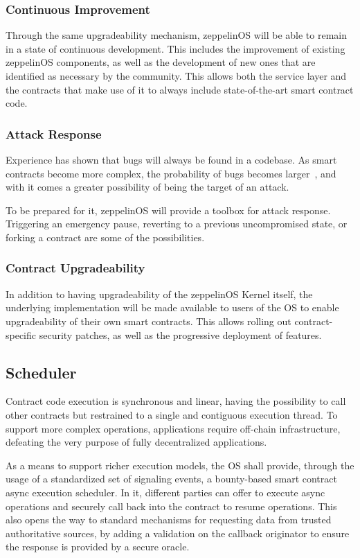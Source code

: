 \documentclass[]{article}
\makeatletter
\DeclareRobustCommand{\_}{%
  \leavevmode\vbox{%
    \hrule\@width.5em
          \@height-.26ex
          \@depth\dimexpr.26ex+.28pt\relax}}
\makeatother
\begin{document}
\subsubsection{Continuous Improvement}

Through the same upgradeability mechanism, zeppelinOS will be able
to remain in a state of continuous development. This includes the
improvement of existing zeppelinOS components, as well as the
development of new ones that are identified as necessary by the
community. This allows both the service layer and the contracts that
make use of it to always include state-of-the-art smart contract code.

\subsubsection{Attack Response}

Experience has shown that bugs will always be found in a codebase. As smart
contracts become more complex, the probability of bugs becomes
larger~\cite{schneier}, and with it comes a greater possibility of being the
target of an attack.

To be prepared for it, zeppelinOS will provide a toolbox for attack response.
Triggering an emergency pause, reverting to a previous uncompromised
state, or forking a contract are some of the possibilities.

\subsubsection{Contract Upgradeability}

In addition to having upgradeability of the zeppelinOS Kernel itself,
the underlying implementation will be made available to users of the OS
to enable upgradeability of their own smart contracts. This allows
rolling out contract-specific security patches, as well as the
progressive deployment of features.

\subsection{Scheduler}

Contract code execution is synchronous and linear, having the
possibility to call other contracts but restrained to a single and
contiguous execution thread. To support more complex operations,
applications require off-chain infrastructure, defeating the very
purpose of fully decentralized applications.

As a means to support richer execution models, the OS shall provide,
through the usage of a standardized set of signaling events, a
bounty-based smart contract async execution scheduler. In it, different
parties can offer to execute async operations and securely call back
into the contract to resume operations. This also opens the way to
standard mechanisms for requesting data from trusted authoritative
sources, by adding a validation on the callback originator to ensure the
response is provided by a secure oracle.
\end{document}
